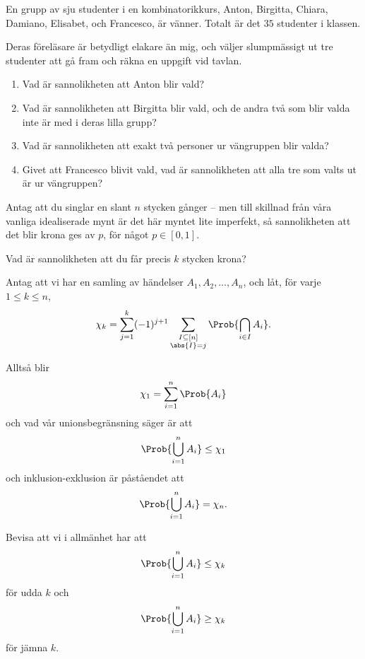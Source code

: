\documentclass[nobib]{tufte-handout}
\begin{document}
\begin{xca}
    En grupp av sju studenter i en kombinatorikkurs, Anton, Birgitta, Chiara, Damiano, Elisabet, och Francesco, är vänner. Totalt är det $35$ studenter i klassen.

    Deras föreläsare är betydligt elakare än mig, och väljer slumpmässigt ut tre studenter att gå fram och räkna en uppgift vid tavlan.

    \begin{enumerate}
        \item Vad är sannolikheten att Anton blir vald?
        \item Vad är sannolikheten att Birgitta blir vald, och de andra två som blir valda inte är med i deras lilla grupp?
        \item Vad är sannolikheten att exakt två personer ur vängruppen blir valda?
        \item Givet att Francesco blivit vald, vad är sannolikheten att alla tre som valts ut är ur vängruppen?
    \end{enumerate}
\end{xca}

\begin{xca}
    Antag att du singlar en slant $n$ stycken gånger -- men till skillnad från våra vanliga idealiserade mynt är det här myntet lite imperfekt, så sannolikheten att det blir krona ges av $p$, för något $p \in [0,1]$.

    Vad är sannolikheten att du får precis $k$ stycken krona?
\end{xca}

\begin{xca}
    Antag att vi har en samling av händelser $A_1, A_2, \ldots, A_n$, och låt, för varje $1 \leq k \leq n$,
    $$\chi_k = \sum_{j=1}^{k} (-1)^{j+1}\sum_{\substack{I \subseteq [n]\\\abs{I} = j}} \Prob{\bigcap_{i\in I} A_i}.$$
    
    Alltså blir
    $$\chi_1 = \sum_{i=1}^{n} \Prob{A_i}$$
    och vad vår unionsbegränsning säger är att
    $$\Prob{\bigcup_{i=1}^n A_i} \leq \chi_1$$
    och inklusion-exklusion är påståendet att
    $$\Prob{\bigcup_{i=1}^n A_i} = \chi_n.$$

    Bevisa att vi i allmänhet har att
    $$\Prob{\bigcup_{i=1}^n A_i} \leq \chi_k$$
    för udda $k$ och
    $$\Prob{\bigcup_{i=1}^n A_i} \geq \chi_k$$
    för jämna $k$.
\end{xca}

%
%
\end{document}
